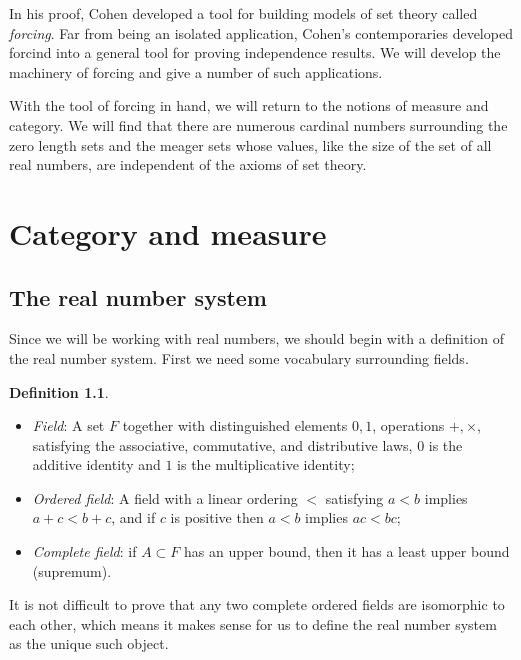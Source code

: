 \documentclass[11pt,oneside]{amsbook}
\theoremstyle{definition}
\theoremstyle{plain}
\theoremstyle{definition}
\newtheorem{definition}[theorem]{Definition}
\theoremstyle{remark}
\numberwithin{equation}{section}
\numberwithin{figure}{section}
\begin{document}
In his proof, Cohen developed a tool for building models of set theory called \emph{forcing}. Far from being an isolated application, Cohen's contemporaries developed forcind into a general tool for proving independence results. We will develop the machinery of forcing and give a number of such applications.

With the tool of forcing in hand, we will return to the notions of measure and category. We will find that there are numerous cardinal numbers surrounding the zero length sets and the meager sets whose values, like the size of the set of all real numbers, are independent of the axioms of set theory.


\chapter{Category and measure}

\section{The real number system}

Since we will be working with real numbers, we should begin with a definition of the real number system. First we need some vocabulary surrounding fields.

\begin{definition}
  \begin{itemize}
    \item \emph{Field}: A set $F$ together with distinguished elements $0,1$, operations $+,\times$, satisfying the associative, commutative, and distributive laws, $0$ is the additive identity and $1$ is the multiplicative identity;
    \item \emph{Ordered field}: A field with a linear ordering $<$ satisfying $a<b$ implies $a+c<b+c$, and if $c$ is positive then $a<b$ implies $ac<bc$;
    \item \emph{Complete field}: if $A\subset F$ has an upper bound, then it has a least upper bound (supremum).
  \end{itemize}
\end{definition}

It is not difficult to prove that any two complete ordered fields are isomorphic to each other, which means it makes sense for us to define the real number system as the unique such object.
\end{document}
